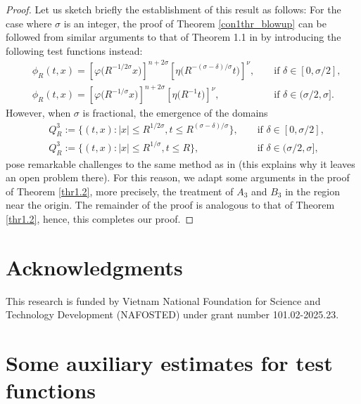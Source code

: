 \documentclass[11pt,reqno]{amsart}
\numberwithin{equation}{section}
\begin{document}
\begin{proof}
    Let us sketch briefly the establishment of this result as follows: For the case where $\sigma$ is an integer, the proof of Theorem \ref{con1thr_blowup} can be followed from similar arguments to that of Theorem 1.1 in \cite{TangDaoCung2026} by introducing the following test functions instead: 
    \begin{align*}
    &\phi_{R}(t,x)=\left[\varphi\big(R^{-1/2\sigma}x\big)\right]^{n+2\sigma}\left[\eta\big(R^{-(\sigma-\delta)/\sigma}t)\right]^{\nu},&&\text{ if }\delta\in [0,\sigma/2],\\
    &\phi_{R}(t,x)=\left[\varphi\big(R^{-1/\sigma}x\big)\right]^{n+2\sigma}\left[\eta\big(R^{-1}t)\right]^{\nu},&&\text{ if }\delta\in (\sigma/2,\sigma].
    \end{align*}
    However, when $\sigma$ is fractional, the emergence of the domains 
    \begin{align*}
        &Q^3_{R} := \Big\{(t,x) : |x| \leq R^{1/2\sigma}, t \leq R^{(\sigma-\delta)/\sigma}\Big\},&&\text{ if }\delta\in [0,\sigma/2],\\
        &Q^3_{R} := \big\{(t,x) : |x| \leq R^{1/\sigma}, t \leq R\big\},&&\text{ if }\delta\in (\sigma/2,\sigma],
    \end{align*}
    pose remarkable challenges to the same method as in \cite{TangDaoCung2026} (this explains why it leaves an open problem there). For this reason, we adapt some arguments in the proof of Theorem \ref{thr1.2}, more precisely, the treatment of $A_3$ and $B_3$ in the region near the origin. The remainder of the proof is analogous to that of Theorem \ref{thr1.2}, hence, this completes our proof.
\end{proof}


    
\section*{Acknowledgments}
This research is funded by Vietnam National Foundation for Science and Technology Development (NAFOSTED) under grant number 101.02-2025.23.

\appendix
\section{Some auxiliary estimates for test functions}
\end{document}

